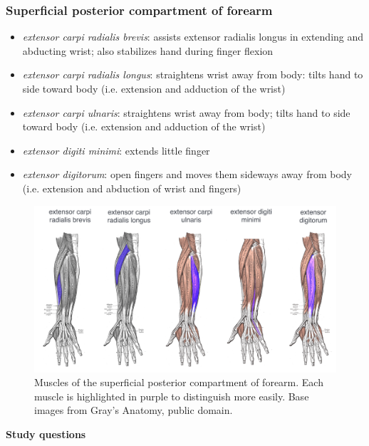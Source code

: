 \documentclass{article}
\begin{document}
\subsubsection{Superficial posterior compartment of forearm}

\begin{itemize}
\item \textit{extensor carpi radialis brevis}: assists extensor radialis longus in extending and abducting wrist; also stabilizes hand during finger flexion
\item \textit{extensor carpi radialis longus}: straightens wrist away from body: tilts hand to side toward body (i.e. extension and adduction of the wrist)
\item \textit{extensor carpi ulnaris}: straightens wrist away from body; tilts hand to side toward body (i.e. extension and adduction of the wrist)
\item \textit{extensor digiti minimi}: extends little finger
\item \textit{extensor digitorum}: open fingers and moves them sideways away from body (i.e. extension and abduction of wrist and fingers)
\end{itemize}

\begin{figure}[!htbp]
\centering
\includegraphics[width=0.9\linewidth]{files/EPpXta8zJdzN048lz8AR-f0bad1de4554c717f552a071f01510df.png}
\caption[]{Muscles of the superficial posterior compartment of forearm. Each muscle is highlighted in purple to distinguish more easily. Base images from Gray's Anatomy, public domain.}
\label{jlCMu7lmVf}
\end{figure}

\textbf{Study questions}
\end{document}
